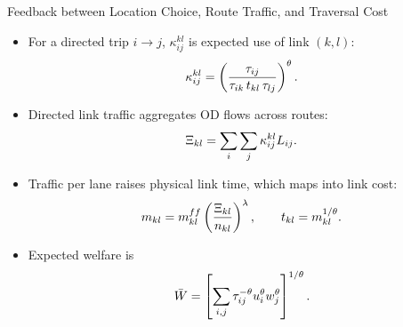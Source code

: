 \documentclass[11pt,aspectratio=169]{beamer}
\begin{document}
\begin{frame}{Feedback between Location Choice, Route Traffic, and Traversal Cost}
\begin{itemize}\footnotesize
  \item For a directed trip $i\to j$, $\kappa^{kl}_{ij}$ is expected use of link $(k,l)$:
  \vspace{-0.8em}\begin{equation}
    \kappa^{kl}_{ij}=\left(\frac{\tau_{ij}}{\tau_{ik}\,t_{kl}\,\tau_{lj}}\right)^\theta.
  \vspace{-0.6em}\end{equation}
  \item Directed link traffic aggregates OD flows across routes:
  \vspace{-0.5em}\begin{equation}\label{eq:Xi_c}
    \Xi_{kl}=\sum_i\sum_j\kappa^{kl}_{ij}L_{ij}.
  \vspace{-0.6em}\end{equation}
  \item Traffic per lane raises physical link time, which maps into link cost:
  \vspace{-0.5em}\begin{equation}\label{eq:c_Xi}
    m_{kl}=m_{kl}^{ff}\left(\frac{\Xi_{kl}}{n_{kl}}\right)^\lambda,
    \qquad t_{kl}=m_{kl}^{1/\theta}.
  \vspace{-0.6em}\end{equation}
  \item Expected welfare is
  \vspace{-0.5em}\begin{equation}
    \bar W=\left[\sum_{i,j}\tau_{ij}^{-\theta}u_i^\theta w_j^\theta\right]^{1/\theta}.
  \vspace{-0.8em}\end{equation}
\end{itemize}
\end{frame}
\end{document}
